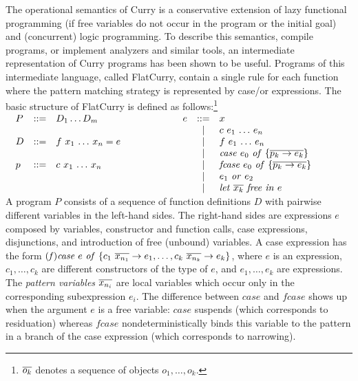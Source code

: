 \documentclass{llncs}
\begin{document}
The operational semantics of Curry \cite{AlbertHanusHuchOliverVidal05,Hanus97POPL}
is a conservative extension of lazy functional programming (if free variables
do not occur in the program or the initial goal) and (concurrent)
logic programming.
To describe this semantics, compile programs, or implement analyzers and
similar tools, an intermediate representation of Curry programs has been
shown to be useful.
Programs of this intermediate language, called FlatCurry,
contain a single rule for each function where the pattern matching strategy
is represented by case/or expressions.
The basic structure of FlatCurry is defined as follows:\footnote{$\overline{o_k}$ denotes a sequence of objects $o_1,\ldots,o_k$.}\\[2ex]
{\small 
$
\begin{array}{@{~~~}lcl@{\hspace*{15ex}}lcl}
P & ::= & D_1 \ldots D_m & e & ::= & x \\
&&& & | & c~e_1\,\ldots\, e_n  \\
D & ::= & f~x_1 \,\ldots\, x_n = e & 
  & | & f~e_1 \,\ldots\, e_n  \\
  & & &
  & | & \mathit{case}~e_0~\mathit{of}~\{\ol{p_k\to e_k}\} \\
p & ::= & c~x_1 \,\ldots\, x_n  &
  & | & \mathit{fcase}~e_0~\mathit{of}~\{\ol{p_k\to e_k}\} \\
  & & &
  & | & e_1~\mathit{or}~e_2 \\
  & & &
  & | & \mathit{let}~\ol{x_k}~\mathit{free~in~} e \\
\end{array}
$}\\[2ex]
A program $P$ consists of a sequence of
function definitions $D$ with pairwise different variables in the left-hand sides.
The right-hand sides are expressions $e$ composed by variables, constructor and
function calls, case expressions, disjunctions,
and introduction of free (unbound) variables.
A case expression has the form
$
\mathit{(f)case}~e~\mathit{of}~
\{c_1~\overline{x_{n_1}} \to e_1,\ldots,c_k~\overline{x_{n_k}} \to e_k\}
$,
where $e$ is an expression, $c_1,\ldots,c_k$ are different 
constructors of the
type of $e$, and $e_1,\ldots, e_k$ are expressions.
The \emph{pattern variables} $\overline{x_{n_i}}$ are local
variables which occur only in the corresponding subexpression $e_i$.
The difference between $\mathit{case}$ and $\mathit{fcase}$ shows up when the
argument $e$ is a free variable:
$\mathit{case}$ suspends (which corresponds to residuation)
whereas $\mathit{fcase}$ nondeterministically binds this variable
to the pattern in a branch of the case expression
(which corresponds to narrowing).
\end{document}
